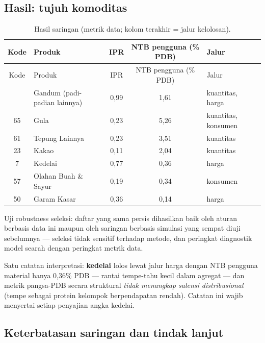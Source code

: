 \documentclass[
  manuscript=article,
  layout=publish,
  year=2026,
  volume=1,
]{den}
\begin{document}
\subsection{Hasil: tujuh komoditas}\label{hasil-tujuh-komoditas}

\begin{longtable}[]{@{}clccl@{}}
\caption{Hasil saringan (metrik data; kolom terakhir = jalur
kelolosan).}\label{tbl-screen}\tabularnewline
\toprule\noalign{}
Kode & Produk & IPR & NTB pengguna (\% PDB) & Jalur \\
\midrule\noalign{}
\endfirsthead
\toprule\noalign{}
Kode & Produk & IPR & NTB pengguna (\% PDB) & Jalur \\
\midrule\noalign{}
\endhead
\bottomrule\noalign{}
\endlastfoot
9 & Gandum (padi-padian lainnya) & 0,99 & 1,61 & kuantitas, harga \\
65 & Gula & 0,23 & 5,26 & kuantitas, konsumen \\
61 & Tepung Lainnya & 0,23 & 3,51 & kuantitas \\
23 & Kakao & 0,11 & 2,04 & kuantitas \\
7 & Kedelai & 0,77 & 0,36 & harga \\
57 & Olahan Buah \& Sayur & 0,19 & 0,34 & konsumen \\
50 & Garam Kasar & 0,36 & 0,14 & harga \\
\end{longtable}

Uji robustness seleksi: daftar yang sama persis dihasilkan baik oleh
aturan berbasis data ini maupun oleh saringan berbasis simulasi yang
sempat diuji sebelumnya --- seleksi tidak sensitif terhadap metode, dan
peringkat diagnostik model searah dengan peringkat metrik data.

Satu catatan interpretasi: \textbf{kedelai} lolos lewat jalur harga
dengan NTB pengguna material hanya 0,36\% PDB --- rantai tempe-tahu
kecil dalam agregat --- dan metrik pangsa-PDB secara struktural
\emph{tidak menangkap salensi distribusional} (tempe sebagai protein
kelompok berpendapatan rendah). Catatan ini wajib menyertai setiap
penyajian angka kedelai.

\subsection{Keterbatasan saringan dan tindak
lanjut}\label{keterbatasan-saringan-dan-tindak-lanjut}
\end{document}
